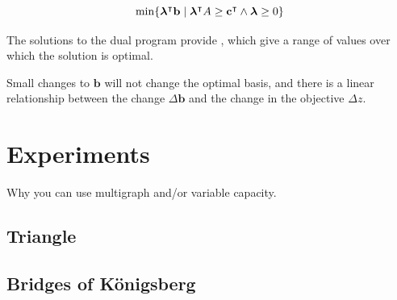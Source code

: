 \begin{equation}
\min \{ %
\bm{\lambda} \transpose
\mathbf{b} \;|\;
\bm{\lambda} \transpose A \geq \mathbf{c} \transpose \land \bm{\lambda} \geq 0 \}
\end{equation}

The solutions to the dual program provide , which give a range of values over which the solution is optimal.

Small changes to $\mathbf{b}$ will not change the optimal basis, and there is a linear relationship between the change $\Delta \mathbf{b}$ and the change in the objective $\Delta z$.

\section{Experiments} \label{sec:robustness experiments}

Why you can use multigraph and/or variable capacity.

\subsection{Triangle} \label{sec:triangle}

\subsection{Bridges of K\"onigsberg}

